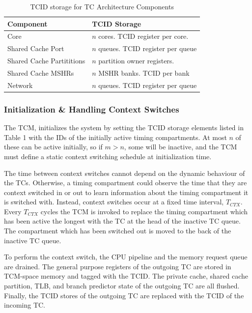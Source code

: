 \begin{table}
\begin{center}
    \begin{footnotesize}
\begin{tabular}{l|l}
    \hline
    Component & TCID Storage \\
    \hline
    Core & $n$ cores. TCID register per core. \\
    Shared Cache Port & $n$ queues. TCID register per queue \\
    Shared Cache Partititions & $n$ partition owner registers. \\
    Shared Cache MSHRs & $n$ MSHR banks. TCID per bank \\
    Network & $n$ queues. TCID register per queue\\
    \hline
\end{tabular}
    \end{footnotesize}
    \caption{TCID storage for TC Architecture Components}
    \label{table:tcid}
\end{center}
\end{table}

\subsubsection{Initialization \& Handling Context Switches}
The TCM, initializes the system by setting the TCID storage elements listed in 
Table 1 with the IDs of the initially active timing compartments. At most $n$ 
of these can be active initially, so if $m>n$, some will be inactive, and the 
TCM must define a static context switching schedule at initialization time.

The time between context switches cannot depend on the dynamic behaviour of the 
TCs. Otherwise, a timing compartment could observe the time that they are 
context switched in or out to learn information about the timing compartment it 
is switched with. Instead, context switches occur at a fixed time interval, 
$T_{CTX}$. Every $T_{CTX}$ cycles the TCM is invoked to replace the timing 
compartment which has been active the longest with the TC at the head of the 
inactive TC queue. The compartment which has been switched out is moved to the 
back of the inactive TC queue.

To perform the context switch, the CPU pipeline and the memory request queue 
are drained. The general purpose registers of the outgoing TC are stored in 
TCM-space memory and tagged with the TCID. The private cache, shared cache 
partition, TLB, and branch predictor state of the outgoing TC are all flushed.  
Finally, the TCID stores of the outgoing TC are replaced with the TCID of the 
incoming TC. 

